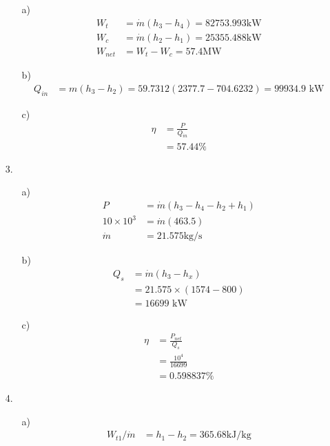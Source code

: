 \documentclass{article}
\begin{document}
\begin{itemize}
\begin{itemize}
        \item [a)]
        \begin{align*}
            W_t&=\dot m(h_3-h_4)=82753.993 \text{kW}\\
            W_c&=\dot m(h_2-h_1)=25355.488 \text{kW}\\
            W_{net}&=W_t-W_c=57.4\text{MW}
        \end{align*}
        \item [b)]
        \begin{align*}
            Q_{in}&=m(h_3-h_2)=59.7312(2377.7-704.6232)=99934.9\text{ kW}
        \end{align*}
        \item [c)]
        \begin{align*}
            \eta &=\frac{P}{Q_{in}}\\
            &=57.44\%
        \end{align*}
    \end{itemize}
    \item [3.]
    \begin{itemize}
        \item [a)]
        \begin{align*}
            P&=\dot m(h_3-h_4-h_2+h_1)\\
            10\times 10^3&=\dot m(463.5)\\
            \dot m&=21.575 \text{kg/s}
        \end{align*}
        \item [b)]
        \begin{align*}
            Q_s&=\dot m(h_3-h_x)\\
            &=21.575\times (1574-800)\\
            &=16699 \text{ kW}
        \end{align*}
        \item [c)]
        \begin{align*}
            \eta &=\frac{P_{net}}{Q_s}\\
            &=\frac{10^4}{16699}\\
            &=0.598837\%
        \end{align*}
    \end{itemize}
    \item [4.]
    \begin{itemize}
        \item [a)]
        \begin{align*}
            W_{t1}/\dot m&=h_1-h_2=365.68 \text{kJ/kg}\\

\end{align*}
\end{itemize}
\end{itemize}
\end{document}
